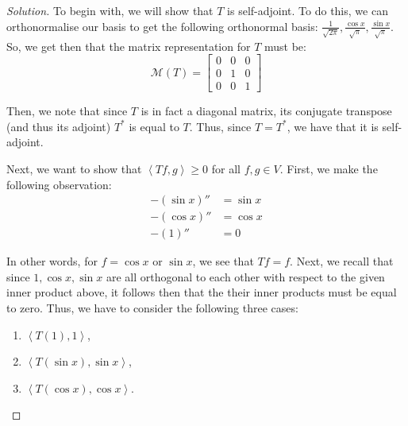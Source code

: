 \documentclass{article}
\newenvironment{solution}{\begin{proof}[Solution]}{\end{proof}}
\newcommand{\innerproduct}[2]{\left\langle{#1}, {#2}\right\rangle}
\begin{document}
\begin{solution}
\begin{comment}
	In the first case, we note that since $T(1) = 0$, it follows then that $\innerproduct{T(1)}{1} = 0$. For the other two cases, we observe that:
	\begin{align*}
		\innerproduct{T(\sin x)}{\sin x} &= \int_{-\pi}^{\pi} \sin^{2} (x) \mathrm dx \\
		&= \pi \\
		\innerproduct{T(\cos x)}{\cos x} &= \int_{-\pi}^{\pi} \cos^{2}(x) \mathrm dx \\
		&= \pi
	\end{align*}
	
	Thus, we see that, indeed, since $T$ is both self-adjoint and $\innerproduct{Tf}{g} \geq 0$ for all $f \in V$, it follows then that it is in fact a non-negative operator as desired.
	\end{comment}
	To begin with, we will show that $T$ is self-adjoint. To do this, we can orthonormalise our basis to get the following orthonormal basis: $\frac{1}{\sqrt{2\pi}}, \frac{\cos x}{\sqrt{\pi}}, \frac{\sin x}{\sqrt{\pi}}$. So, we get then that the matrix representation for $T$ must be:
	\begin{equation*}
		\mathcal{M}(T) = \begin{bmatrix}
			0 & 0 & 0 \\
			0 & 1 & 0 \\
			0 & 0 & 1
		\end{bmatrix}
	\end{equation*}

	Then, we note that since $T$ is in fact a diagonal matrix, its conjugate transpose (and thus its adjoint) $T^{*}$ is equal to $T$. Thus, since $T = T^{*}$, we have that it is self-adjoint.
	
	Next, we want to show that $\innerproduct{Tf}{g} \geq 0$ for all $f,g \in V$. First, we make the following observation:
	\begin{align*}
		-(\sin x)'' &= \sin x \\
		-(\cos x)'' &= \cos x \\
		-(1)'' &= 0
	\end{align*}
	
	In other words, for $f = \cos x$ or $\sin x$, we see that $Tf = f$. Next, we recall that since $1, \cos x, \sin x$ are all orthogonal to each other with respect to the given inner product above, it follows then that the their inner products must be equal to zero. Thus, we have to consider the following three cases:
	\begin{enumerate}
		\item $\innerproduct{T(1)}{1}$,
		\item $\innerproduct{T(\sin x)}{\sin x}$,
		\item $\innerproduct{T(\cos x)}{\cos x}$.
	\end{enumerate}
	

\end{solution}
\end{document}

